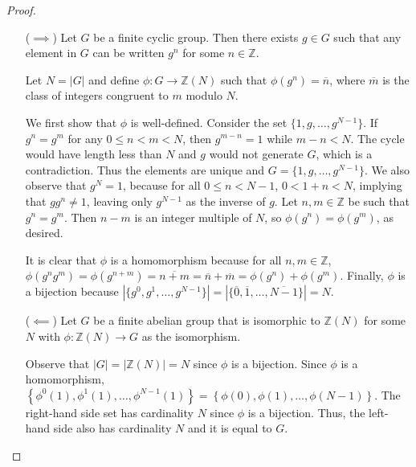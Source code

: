 \documentclass[oneside]{article}
\newcommand\abs[1]{\left|#1\right|}
\newcommand\bbZ{\mathbb{Z}}
\begin{document}
  \begin{proof}
    \hspace{0pt}
    \begin{itemize}
      \item[($\implies$)] Let $G$ be a finite cyclic group. Then there exists $g \in G$ such that any element in $G$ can be written $g^n$ for some $n \in \bbZ$.

      Let $N = \abs{G}$ and define $\phi : G \to \bbZ(N)$ such that $\phi(g^n) = \overline{n}$, where $\overline{m}$ is the class of integers congruent to $m$ modulo $N$.

      We first show that $\phi$ is well-defined. Consider the set $\{1, g, \dots, g^{N-1}\}$. If $g^n = g^m$ for any $0 \leq n < m < N$, then $g^{m-n} = 1$ while $m-n < N$. The cycle would have length less than $N$ and $g$ would not generate $G$, which is a contradiction. Thus the elements are unique and $G = \{1, g, \dots, g^{N-1}\}$. We also observe that $g^N = 1$, because for all $0 \leq n < N - 1$, $0 < 1 + n < N$, implying that $gg^n \neq 1$, leaving only $g^{N-1}$ as the inverse of $g$. Let $n, m \in \bbZ$ be such that $g^n = g^m$. Then $n - m$ is an integer multiple of $N$, so $\phi(g^n) = \phi(g^m)$, as desired.

      It is clear that $\phi$ is a homomorphism because for all $n, m \in \bbZ$, $\phi(g^ng^m) = \phi(g^{n+m}) = \overline{n+m} = \overline{n} + \overline{m} = \phi(g^n) + \phi(g^m)$. Finally, $\phi$ is a bijection because $\abs{\{g^0, g^1, \dots, g^{N - 1}\}} = \abs{\{\overline{0}, \overline{1}, \dots, \overline{N - 1}\}} = N$.

      \item[($\impliedby$)] Let $G$ be a finite abelian group that is isomorphic to $\bbZ(N)$ for some $N$ with $\phi : \bbZ(N) \to G$ as the isomorphism.

      Observe that $\abs{G} = \abs{\bbZ(N)} = N$ since $\phi$ is a bijection. Since $\phi$ is a homomorphism, $\left\{\phi^0(1), \phi^1(1), \dots, \phi^{N - 1}(1)\right\} = \left\{\phi(0), \phi(1), \dots, \phi(N - 1)\right\}$. The right-hand side set has cardinality $N$ since $\phi$ is a bijection. Thus, the left-hand side also has cardinality $N$ and it is equal to $G$.
    \end{itemize}
  \end{proof}
\end{document}

